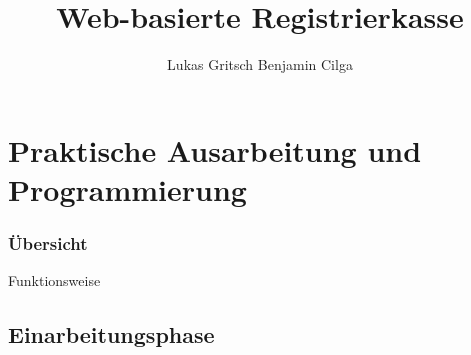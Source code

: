\documentclass[12pt]{beamer}
\title{Web-basierte Registrierkasse}
\author{Lukas Gritsch Benjamin Cilga}
\begin{document}
\begin{frame}[plain]
\maketitle
\small
\end{frame}

\begin{frame}
	\tableofcontents
\end{frame}


\section{Praktische Ausarbeitung und Programmierung}

\begin{frame}
\frametitle{Übersicht}
\Large Funktionsweise
\begin{figure}[h]
	\centering
	 \hfill
	
\end{figure}
\end{frame}

\subsection{Einarbeitungsphase}
\end{document}
